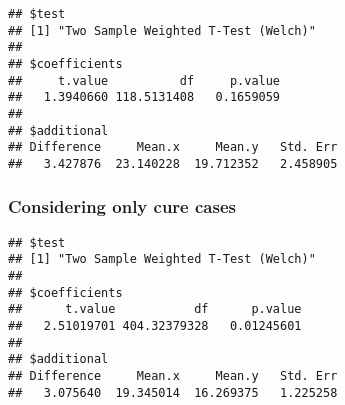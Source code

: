 \documentclass[
]{article}
\newenvironment{Shaded}{\begin{snugshade}}{\end{snugshade}}
\newcommand{\AttributeTok}[1]{\textcolor[rgb]{0.13,0.29,0.53}{#1}}
\newcommand{\CommentTok}[1]{\textcolor[rgb]{0.56,0.35,0.01}{\textit{#1}}}
\newcommand{\FunctionTok}[1]{\textcolor[rgb]{0.13,0.29,0.53}{\textbf{#1}}}
\newcommand{\NormalTok}[1]{#1}
\newcommand{\OtherTok}[1]{\textcolor[rgb]{0.56,0.35,0.01}{#1}}
\newcommand{\SpecialCharTok}[1]{\textcolor[rgb]{0.81,0.36,0.00}{\textbf{#1}}}
\newcommand{\StringTok}[1]{\textcolor[rgb]{0.31,0.60,0.02}{#1}}
\begin{document}
\begin{verbatim}
## $test
## [1] "Two Sample Weighted T-Test (Welch)"
## 
## $coefficients
##     t.value          df     p.value 
##   1.3940660 118.5131408   0.1659059 
## 
## $additional
## Difference     Mean.x     Mean.y   Std. Err 
##   3.427876  23.140228  19.712352   2.458905
\end{verbatim}

\hypertarget{considering-only-cure-cases}{%
\subsubsection{\texorpdfstring{{ Considering only cure cases
}}{ Considering only cure cases }}\label{considering-only-cure-cases}}

\begin{Shaded}
\end{Shaded}

\begin{Shaded}
\end{Shaded}

\begin{verbatim}
## $test
## [1] "Two Sample Weighted T-Test (Welch)"
## 
## $coefficients
##      t.value           df      p.value 
##   2.51019701 404.32379328   0.01245601 
## 
## $additional
## Difference     Mean.x     Mean.y   Std. Err 
##   3.075640  19.345014  16.269375   1.225258
\end{verbatim}
\end{document}
